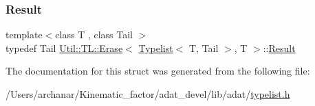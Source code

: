 \mbox{\label{structUtil_1_1TL_1_1Erase_3_01Typelist_3_01T_00_01Tail_01_4_00_01T_01_4_a847c2a353c4f86e0785cca222a67564e}} 
\subsubsection{\texorpdfstring{Result}{Result}\hspace{0.1cm}{\footnotesize\ttfamily [2/2]}}
{\footnotesize\ttfamily template$<$class T , class Tail $>$ \\
typedef Tail \mbox{\hyperlink{structUtil_1_1TL_1_1Erase}{Util\+::\+T\+L\+::\+Erase}}$<$ \mbox{\hyperlink{structUtil_1_1Typelist}{Typelist}}$<$ T, Tail $>$, T $>$\+::\mbox{\hyperlink{structUtil_1_1TL_1_1Erase_3_01Typelist_3_01T_00_01Tail_01_4_00_01T_01_4_a847c2a353c4f86e0785cca222a67564e}{Result}}}



The documentation for this struct was generated from the following file\+:\begin{DoxyCompactItemize}
\item 
/\+Users/archanar/\+Kinematic\+\_\+factor/adat\+\_\+devel/lib/adat/\mbox{\hyperlink{lib_2adat_2typelist_8h}{typelist.\+h}}\end{DoxyCompactItemize}
